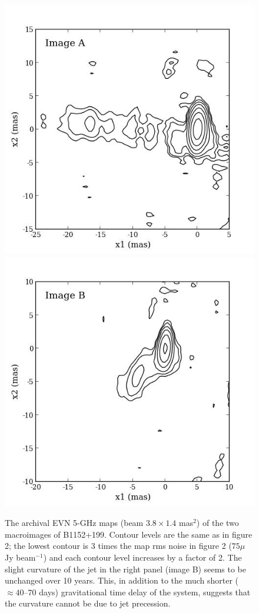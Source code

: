 \documentclass[a4paper, 11pt]{article}
\begin{document}
\begin{figure}[tbh]
\centering
\includegraphics[scale=0.5]{Figure_2012A.jpg}
\includegraphics[scale=0.5]{Figure_2012B.jpg}
\caption{The archival EVN 5-GHz maps (beam $3.8 \times 1.4$ mas$^2$) of the two macroimages of B1152+199. Contour levels are the same as in figure 2; the lowest contour is 3 times the map rms noise in figure 2 ($75 \mu$ Jy beam$^{-1}$) and each contour level increases by a factor of 2. The slight curvature of the jet in the right panel (image B) seems to be unchanged over 10 years. This, in addition to the much shorter ($\approx 40$--$70$ days) gravitational time delay of the system, suggests that the curvature cannot be due to jet precession.}
\end{figure}
\end{document}
